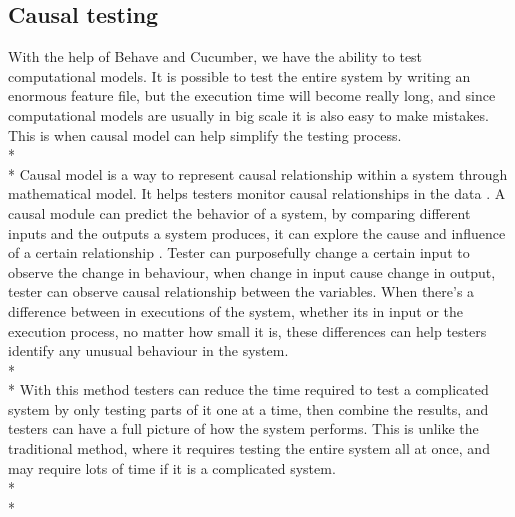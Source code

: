 \subsection{Causal testing}
With the help of Behave and Cucumber, we have the ability to test computational models. It is possible to test the entire system by writing an enormous feature file, but the execution time will become really long, and since computational models are usually in big scale it is also easy to make mistakes. This is when causal model can help simplify the testing process. \\*\\*
Causal model is a way to represent causal relationship within a system through mathematical model. It helps testers monitor causal relationships in the data \cite{Reference16}. A causal module can predict the behavior of a system, by comparing different inputs and the outputs a system produces, it can explore the cause and influence of a certain relationship \cite{Reference17}. Tester can purposefully change a certain input to observe the change in behaviour, when change in input cause change in output, tester can observe causal relationship between the variables. When there’s a difference between in executions of the system, whether its in input or the execution process, no matter how small it is, these differences can help testers identify any unusual behaviour in the system.\cite{Reference18} \\*\\*
With this method testers can reduce the time required to test a complicated system by only testing parts of it one at a time, then combine the results, and testers can have a full picture of how the system performs. This is unlike the traditional method, where it requires testing the entire system all at once, and may require lots of time if it is a complicated system. \\*\\*

